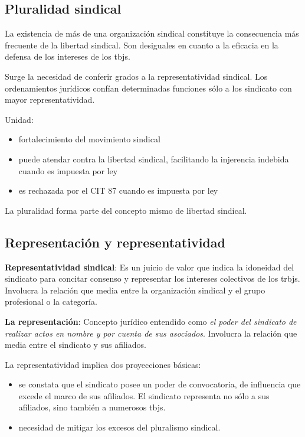 \documentclass[spanish,12pt,a4paper,titlepage]{report}
\begin{document}
\subsection{Pluralidad sindical}
La existencia de más de una organización sindical constituye la consecuencia más frecuente de la libertad sindical. Son desiguales en cuanto a la eficacia en la defensa de los intereses de los tbjs. 

Surge la necesidad de conferir grados a la representatividad sindical. Los ordenamientos jurídicos confían determinadas funciones sólo a los sindicato con mayor representatividad.

Unidad:
\begin{itemize}


\item fortalecimiento del movimiento sindical
\item puede atendar contra la libertad sindical, facilitando la injerencia indebida cuando es impuesta por ley
\item es rechazada por el CIT 87 cuando es impuesta por ley
\end{itemize}
La pluralidad forma parte del concepto mismo de libertad sindical.

\subsection{Representación y representatividad}

\textbf{Representatividad sindical}: Es un juicio de valor que indica la idoneidad del sindicato  para concitar consenso y representar los intereses colectivos de los trbjs. Involucra la relación que media entre la organización sindical y el grupo profesional o la categoría.

\textbf{La representación}: Concepto jurídico entendido como \textit{el poder del sindicato de realizar actos en nombre y por cuenta de sus asociados}. Involucra la relación que media entre el sindicato y sus afiliados.

La representatividad implica dos proyecciones básicas:

\begin{itemize}
\item se constata que el sindicato posee un poder de convocatoria, de influencia que excede el marco de sus afiliados. El sindicato representa no sólo a sus afiliados, sino también a numerosos tbjs.

\item necesidad de mitigar los excesos del pluralismo sindical.
\end{itemize}
\end{document}
